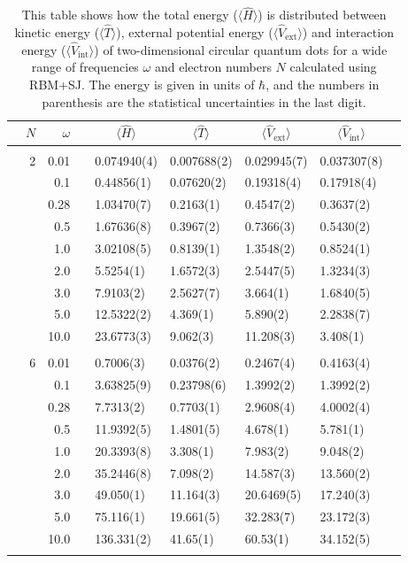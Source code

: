 \begin{table}[H]
	\caption{This table shows how the total energy ($\langle\hat{H}\rangle$) is distributed between kinetic energy ($\langle\hat{T}\rangle$), external potential energy ($\langle\hat{V}_{\text{ext}}\rangle$) and interaction energy ($\langle\hat{V}_{\text{int}}\rangle$) of two-dimensional circular quantum dots for a wide range of frequencies $\omega$ and electron numbers $N$ calculated using RBM+SJ. The energy is given in units of $\hbar$, and the numbers in parenthesis are the statistical uncertainties in the last digit.}
	\label{tab:splitfrequencyQDRBMSJ}
	\begin{tabularx}{\textwidth}{R{1cm}rrcR{2.3cm}R{2.3cm}R{2.3cm}R{2.3cm}R{1cm}} \hline\hline
		\makecell{\\ \phantom{$N$}} & $N$ & $\omega$ &&  &  &  &  & \\ \hline \\
		&2 & 0.01 && 0.074940(4) & 0.007688(2) & 0.029945(7) & 0.037307(8) \\
		&& 0.1 && 0.44856(1) & 0.07620(2) & 0.19318(4) & 0.17918(4) \\
		&& 0.28 && 1.03470(7) & 0.2163(1) & 0.4547(2) & 0.3637(2) \\
		&& 0.5 && 1.67636(8) & 0.3967(2) & 0.7366(3) & 0.5430(2)\\
		&& 1.0 && 3.02108(5) & 0.8139(1) & 1.3548(2) & 0.8524(1)\\
		&& 2.0 && 5.5254(1) & 1.6572(3) & 2.5447(5) & 1.3234(3) \\
		&& 3.0 && 7.9103(2) & 2.5627(7) & 3.664(1) & 1.6840(5) \\ 
		&& 5.0 && 12.5322(2) & 4.369(1) & 5.890(2) & 2.2838(7) \\
		&& 10.0 && 23.6773(3) & 9.062(3) & 11.208(3) & 3.408(1) \\
		\hdashline \\
		
		&6 & 0.01 && 0.7006(3) & 0.0376(2) & 0.2467(4) & 0.4163(4) \\
		&& 0.1 && 3.63825(9) & 0.23798(6) & 1.3992(2) & 1.3992(2) \\
		&& 0.28 && 7.7313(2) & 0.7703(1) & 2.9608(4) & 4.0002(4) \\
		&& 0.5 && 11.9392(5) & 1.4801(5) & 4.678(1) & 5.781(1) \\
		&& 1.0 && 20.3393(8) & 3.308(1) & 7.983(2) & 9.048(2) \\
		&& 2.0 && 35.2446(8) & 7.098(2) & 14.587(3) & 13.560(2) \\
		&& 3.0 && 49.050(1) & 11.164(3) & 20.6469(5) & 17.240(3) \\ 
		&& 5.0 && 75.116(1) & 19.661(5) & 32.283(7) & 23.172(3) \\
		&& 10.0 && 136.331(2) & 41.65(1) & 60.53(1) & 34.152(5) \\
		\hdashline \\
		

\end{tabularx}
\end{table}
